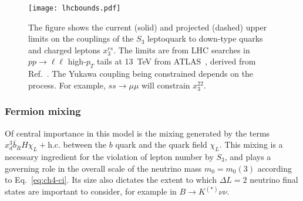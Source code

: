 \begin{figure}[t]
  \centering
  \texttt{[image: lhcbounds.pdf]}
  \caption[The figure shows the current (solid) and projected (dashed) upper
  limits on the couplings of the $S_{3}$ leptoquark to down-type quarks and
  charged leptons $x_{3}^{rs}$.]{The figure shows the current (solid) and
    projected (dashed) upper limits on the couplings of the $S_{3}$ leptoquark
    to down-type quarks and charged leptons $x_{3}^{rs}$. The limits are from
    LHC searches in $pp \to \ell \ell$ high-$p_T$ tails at \SI{13}{\TeV} from
    ATLAS~\cite{ATLAS-CONF-2017-027}, derived from Ref.~\cite{Greljo:2017vvb}.
    The Yukawa coupling being constrained depends on the process. For example,
    $ss \to \mu \mu$ will constrain $x^{22}_{3}$.}
  \label{fig:ch4-lhcbounds}
\end{figure}


\subsubsection{Fermion mixing}

Of central importance in this model is the mixing generated by the terms
$x^{3}_{d} \bar{b}_R H \chi_L + \text{h.c.}$ between the $b$ quark and the quark
field $\chi_{L}$. This mixing is a necessary ingredient for the violation of
lepton number by $S_{3}$, and plays a governing role in the overall scale of the
neutrino mass $m_0 = m_{0}(3)$ according to Eq.~\eqref{eq:ch4-ci}. Its size also
dictates the extent to which $\Delta L=2$ neutrino final states are important to
consider, for example in $B \to K^{(*)} \nu \nu$.

